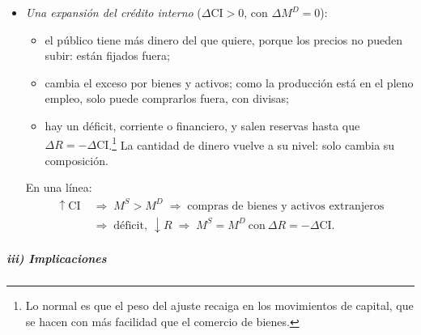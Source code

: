 \documentclass[11pt]{article}
\begin{document}
\begin{itemize}
\item \emph{Una expansión del crédito interno} ($\Delta\mathrm{CI}>0$, con $\Delta M^D=0$):
  \begin{itemize}
  \item el público tiene más dinero del que quiere, porque los precios no pueden subir: están fijados fuera;
  \item cambia el exceso por bienes y activos; como la producción está en el pleno empleo, solo puede comprarlos fuera, con divisas;
  \item hay un déficit, corriente o financiero, y salen reservas hasta que $\Delta R=-\Delta\mathrm{CI}$.\footnote{Lo normal es que el peso del ajuste recaiga en los movimientos de capital, que se hacen con más facilidad que el comercio de bienes.} La cantidad de dinero vuelve a su nivel: solo cambia su composición.
  \end{itemize}
  En una línea:
  \begin{align*}
  \uparrow\mathrm{CI}\;&\Rightarrow\;M^S>M^D\;\Rightarrow\;\text{compras de bienes y activos extranjeros}\\
  &\Rightarrow\;\text{déficit},\ \downarrow R\;\Rightarrow\;M^S=M^D\ \text{con}\ \Delta R=-\Delta\mathrm{CI}.
  \end{align*}
\end{itemize}

\subparagraph{iii) Implicaciones}
\end{document}
